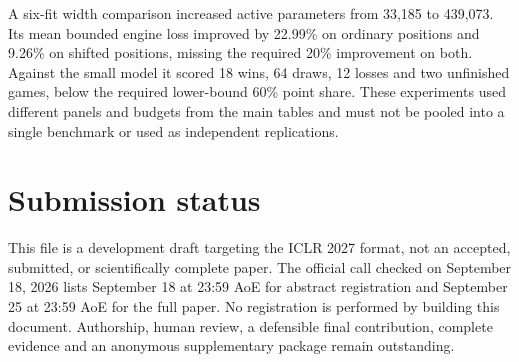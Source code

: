 \documentclass{article}
\begin{document}
A six-fit width comparison increased active parameters from 33,185 to 439,073.
Its mean bounded engine loss improved by 22.99\% on ordinary positions and
9.26\% on shifted positions, missing the required 20\% improvement on both.
Against the small model it scored 18 wins, 64 draws, 12 losses and two unfinished
games, below the required lower-bound 60\% point share. These experiments used
different panels and budgets from the main tables and must not be pooled into
a single benchmark or used as independent replications.




\section{Submission status}
This file is a development draft targeting the ICLR 2027 format, not an accepted,
submitted, or scientifically complete paper. The official call checked on
September 18, 2026 lists September 18 at 23:59 AoE for abstract registration and
September 25 at 23:59 AoE for the full paper. No registration is performed by
building this document. Authorship, human review, a defensible final contribution,
complete evidence and an anonymous supplementary package remain outstanding.
\end{document}
